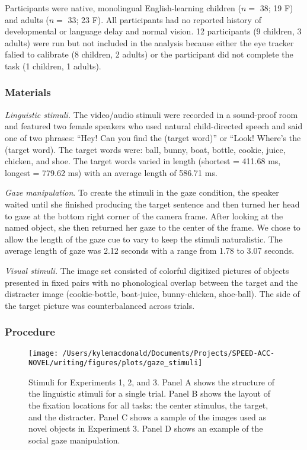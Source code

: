 \documentclass[man,floatsintext]{apa6}
\begin{document}
Participants were native, monolingual English-learning children (\(n=\)
38; 19 F) and adults (\(n=\) 33; 23 F). All participants had no reported
history of developmental or language delay and normal vision. 12
participants (9 children, 3 adults) were run but not included in the
analysis because either the eye tracker falied to calibrate (8 children,
2 adults) or the participant did not complete the task (1 children, 1
adults).

\subsubsection{Materials}\label{materials}

\emph{Linguistic stimuli.} The video/audio stimuli were recorded in a
sound-proof room and featured two female speakers who used natural
child-directed speech and said one of two phrases: \enquote{Hey! Can you
find the (target word)} or ``Look! Where's the (target word). The target
words were: ball, bunny, boat, bottle, cookie, juice, chicken, and shoe.
The target words varied in length (shortest = 411.68 ms, longest =
779.62 ms) with an average length of 586.71 ms.

\emph{Gaze manipulation}. To create the stimuli in the gaze condition,
the speaker waited until she finished producing the target sentence and
then turned her head to gaze at the bottom right corner of the camera
frame. After looking at the named object, she then returned her gaze to
the center of the frame. We chose to allow the length of the gaze cue to
vary to keep the stimuli naturalistic. The average length of gaze was
2.12 seconds with a range from 1.78 to 3.07 seconds.

\emph{Visual stimuli.} The image set consisted of colorful digitized
pictures of objects presented in fixed pairs with no phonological
overlap between the target and the distracter image (cookie-bottle,
boat-juice, bunny-chicken, shoe-ball). The side of the target picture
was counterbalanced across trials.

\subsubsection{Procedure}\label{procedure}

\begin{figure}[!t]

{\centering \texttt{[image: /Users/kylemacdonald/Documents/Projects/SPEED-ACC-NOVEL/writing/figures/plots/gaze\_stimuli]} 

}

\caption{Stimuli for Experiments 1, 2, and 3. Panel A shows the structure of the linguistic stimuli for a single trial. Panel B shows the layout of the fixation locations for all tasks: the center stimulus, the target, and the distracter. Panel C shows a sample of the images used as novel objects in Experiment 3. Panel D shows an example of the social gaze manipulation.}\label{fig:gaze-stimuli}
\end{figure}
\end{document}
